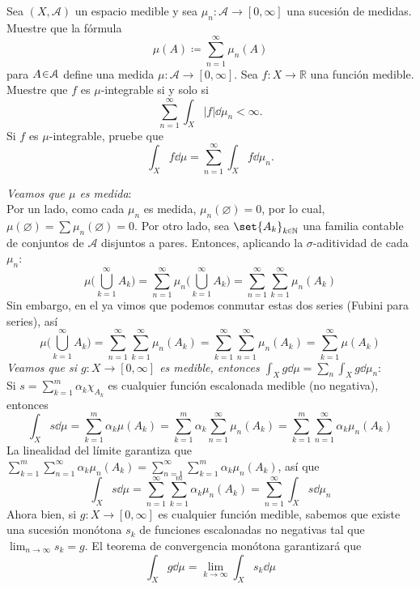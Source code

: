 \setcounter{neje}{61}
\begin{nejer}
Sea $(X, \mathcal{A})$ un espacio medible y sea $\mu_n\colon \mathcal{A} \to [0, \infty]$ una sucesión de medidas. Muestre que la fórmula
$$
\mu(A) \coloneq \sum_{n=1}^{\infty} \mu_n(A)
$$
para $A \en \mathcal{A}$ define una medida $\mu\colon \mathcal{A} \to [0, \infty]$. Sea $f\colon X \to \mathbb{R}$ una función medible. Muestre que $f$ es $\mu$-integrable si y solo si
$$
\sum_{n=1}^{\infty} \int_X |f| \dd{\mu_n} < \infty.
$$
Si $f$ es $\mu$-integrable, pruebe que
$$
\int_X f \dd{\mu} = \sum_{n=1}^{\infty} \int_X f \dd{\mu_n}.
$$
\end{nejer}
\begin{sol}
\emph{Veamos que $\mu$ es medida}:\\
Por un lado, como cada $\mu_n$ es medida, $\mu_n(\varnothing) = 0$, por lo cual, $\mu(\varnothing) = \sum\mu_n(\varnothing) = 0$. Por otro lado, sea $\set{A_k}_{k\en\mathbb{N}}$ una familia contable de conjuntos de $\mathcal{A}$ disjuntos a pares. Entonces, aplicando la $\sigma$-aditividad de cada $\mu_n$:
\[
\mu\biggl( \bigcup^\infty_{k=1} A_k\biggr)
= \sum^\infty_{n=1}\mu_n\biggl( \bigcup^\infty_{k=1} A_k\biggr)
= \sum^\infty_{n=1}\sum^\infty_{k=1} \mu_n(A_k)
\]
Sin embargo, en el  ya vimos que podemos conmutar estas dos series (Fubini para series), así
\[
\mu\biggl( \bigcup^\infty_{k=1} A_k\biggr)
= \sum^\infty_{n=1}\sum^\infty_{k=1} \mu_n(A_k)
= \sum^\infty_{k=1}\sum^\infty_{n=1} \mu_n(A_k)
= \sum^\infty_{k=1} \mu(A_k)
\]
\emph{Veamos que si $g\colon X \to [0,\infty]$ es medible, entonces $\int_X g\dd{\mu} = \sum_n\int_X g \dd{\mu_n}$}:\\
Si $s = \sum^{m}_{k=1} \alpha_k \chi_{A_k}$ es cualquier función escalonada medible (no negativa), entonces
\[
\int_X s \dd{\mu}
= \sum^m_{k=1} \alpha_k\mu(A_k) 
= \sum^m_{k=1} \alpha_k \sum^\infty_{n=1} \mu_n(A_k)
= \sum^m_{k=1} \sum^\infty_{n=1} \alpha_k\mu_n(A_k)
\] 
La linealidad del límite garantiza que $\sum^m_{k=1}\sum^\infty_{n=1} \alpha_k\mu_n(A_k) = \sum^\infty_{n=1}\sum^m_{k=1}\alpha_k\mu_n(A_k)$, así que
\[
\int_X s \dd{\mu}
= \sum^\infty_{n=1}\sum^m_{k=1}\alpha_k\mu_n(A_k)
= \sum^\infty_{n=1} \int_X s \dd{\mu_n}
\]
Ahora bien, si $g \colon X \to [0,\infty]$ es cualquier función medible, sabemos que existe una sucesión monótona $s_k$ de funciones escalonadas no negativas tal que $\lim_{n\to\infty}s_k = g$. El teorema de convergencia monótona garantizará que
\begin{equation}\label{eq:convmon}
\int_X g \dd{\mu} 
= \lim_{k\to\infty} \int_X s_k \dd{\mu}

\end{equation}
\end{sol}
